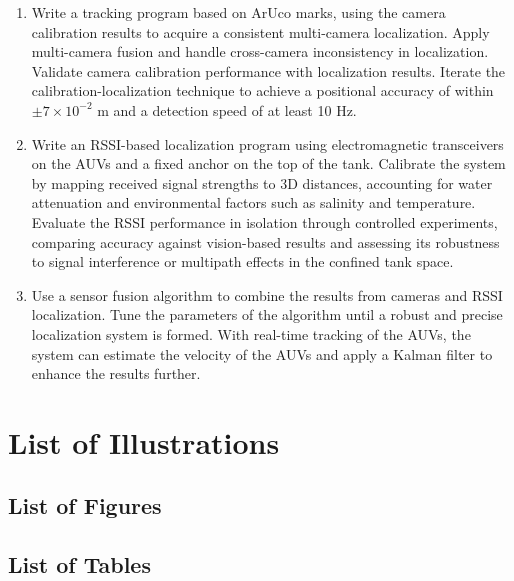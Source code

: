 \documentclass[11pt]{article}
\newcommand{\cn}[1]{\begin{CJK}{UTF8}{gbsn}#1\end{CJK}}
\newcommand{\yh}[1]{\noindent{\color{blue}\textbf{yh: }{\cn{#1}}}}
\begin{document}
\begin{titlepage}
\begin{enumerate}
        \item Write a tracking program based on ArUco marks, using the camera calibration results to acquire a consistent multi-camera localization. Apply multi-camera fusion and handle cross-camera inconsistency in localization. Validate camera calibration performance with localization results. Iterate the calibration-localization technique to achieve a positional accuracy of within $\pm 7\times10^{-2}$ m and a detection speed of at least 10 Hz.
        \item Write an RSSI-based localization program using electromagnetic transceivers on the AUVs and a fixed anchor on the top of the tank. Calibrate the system by mapping received signal strengths to 3D distances, accounting for water attenuation and environmental factors such as salinity and temperature. Evaluate the RSSI performance in isolation through controlled experiments, comparing accuracy against vision-based results and assessing its robustness to signal interference or multipath effects in the confined tank space.
        \item Use a sensor fusion algorithm to combine the results from cameras and RSSI localization. Tune the parameters of the algorithm until a robust and precise localization system is formed. With real-time tracking of the AUVs, the system can estimate the velocity of the AUVs and apply a Kalman filter to enhance the results further.
    \end{enumerate}
    \thispagestyle{empty}
\end{titlepage}

\tableofcontents
\setcounter{page}{2}
\thispagestyle{fancy}

\newpage
\section*{List of Illustrations}
\subsection*{List of Figures}
\listoffigures
\newpage
\subsection*{List of Tables}
\listoftables
\end{document}
